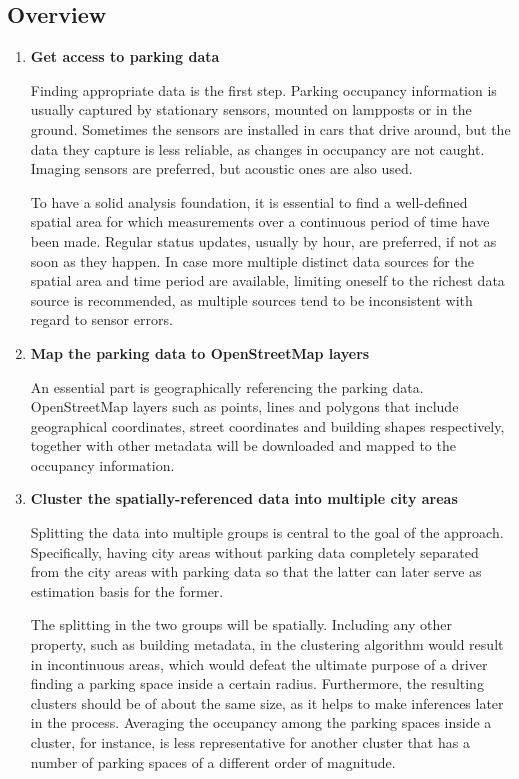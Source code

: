 \documentclass{ws-ijait}
\begin{document}
	\subsection{Overview}
	
	\begin{enumerate}[label=\Roman*]
				
		\item{\textbf{Get access to parking data}}
		
		Finding appropriate data is the first step. Parking occupancy information is usually captured by stationary sensors, mounted on lampposts or in the ground. Sometimes the sensors are installed in cars that drive around, but the data they capture is less reliable, as changes in occupancy are not caught. Imaging sensors are preferred, but acoustic ones are also used.
		
		To have a solid analysis foundation, it is essential to find a well-defined spatial area for which measurements over a continuous period of time have been made. Regular status updates, usually by hour, are preferred, if not as soon as they happen. In case more multiple distinct data sources for the spatial area and time period are available, limiting oneself to the richest data source is recommended, as multiple sources tend to be inconsistent with regard to sensor errors.
		
		
		\item{\textbf{Map the parking data to OpenStreetMap layers}}
		
		An essential part is geographically referencing the parking data. OpenStreetMap layers such as points, lines and polygons that include geographical coordinates, street coordinates and building shapes respectively, together with other metadata will be downloaded and mapped to the occupancy information.
		
		\item{\textbf{Cluster the spatially-referenced data into multiple city areas}}
		
		Splitting the data into multiple groups is central to the goal of the approach. Specifically, having city areas without parking data completely separated from the city areas with parking data so that the latter can later serve as estimation basis for the former. 
		
		The splitting in the two groups will be spatially. Including any other property, such as building metadata, in the clustering algorithm would result in incontinuous areas, which would defeat the ultimate purpose of a driver finding a parking space inside a certain radius. Furthermore, the resulting clusters should be of about the same size, as it helps to make inferences later in the process. Averaging the occupancy among the parking spaces inside a cluster, for instance, is less representative for another cluster that has a number of parking spaces of a different order of magnitude.		
		

\end{enumerate}
\end{document}
